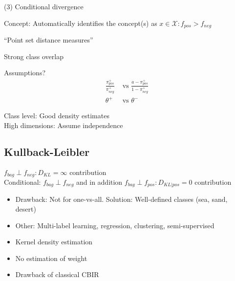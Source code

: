 (3) Conditional divergence

Concept: Automatically identifies the concept(s) as $x \in \mathcal{X}: f_{pos} > f_{neg}$

``Point set distance measures''

Strong class overlap

Assumptions?\\
\begin{align}
  \frac{\pi_{pos}^+}{\pi_{neg}^+} & \text{ vs } \frac{a-\pi_{pos}^+}{1-\pi_{neg}^+} \\
  \theta^+ & \text{ vs } \theta^-
\end{align}

Class level: Good density estimates\\
High dimensions: Assume independence

\subsection{Kullback-Leibler} 

$f_{bag} \perp f_{neg} : D_{KL} = \infty$ contribution \\
Conditional: $f_{bag} \perp f_{neg}$ and in addition $f_{bag} \perp f_{pos} : D_{KL|pos} = 0$ contribution

\begin{itemize}
  \item Drawback: Not for one-vs-all. Solution: Well-defined classes (sea, sand, desert)
  \item Other: Multi-label learning, regression, clustering, semi-supervised
  \item Kernel density estimation
  \item No estimation of weight
  \item Drawback of classical CBIR
\end{itemize}